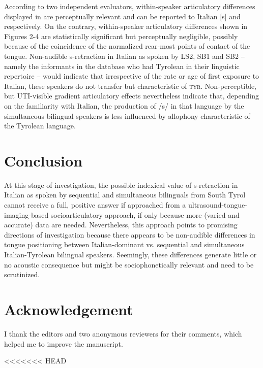 \documentclass[output=paper]{LSP/langsci}
\begin{document}
According to two independent evaluators, within-speaker articulatory differences displayed in  are perceptually relevant and can be reported to Italian [s] and %
respectively. On the contrary, within-speaker articulatory differences shown in Figures 2-4 are statistically significant but perceptually negligible, possibly because of the coincidence of the normalized rear-most points of contact of the tongue. Non-audible s-retraction in Italian as spoken by LS2, SB1 and SB2 – namely the informants in the database who had Tyrolean in their linguistic repertoire – would indicate that irrespective of the rate or age of first exposure to Italian, these speakers do not transfer but %
characteristic of \textsc{tyr}. Non-perceptible, but UTI-visible gradient articulatory effects nevertheless indicate that, depending on the familiarity with Italian, the production of /s/ in that language by the simultaneous bilingual speakers is less influenced by 
allophony characteristic of the Tyrolean language.

\section{Conclusion}
At this stage of investigation, the possible indexical value of s-retraction in Italian as spoken by sequential and simultaneous bilinguals from South Tyrol cannot receive a full, positive answer if approached from a ultrasound-tongue-imaging-based socioarticulatory approach, if only because more (varied and accurate) data are needed. Nevertheless, this approach points to promising directions of investigation because there appears to be non-audible differences in tongue positioning between Italian-dominant vs. sequential and simultaneous Italian-Tyrolean bilingual speakers. Seemingly, these differences generate little or no acoustic consequence but might be sociophonetically relevant and need to be scrutinized.

\section*{Acknowledgement}
I thank the editors and two anonymous reviewers for their comments, which helped me to improve the manuscript.

\printbibliography[heading=subbibliography,notkeyword=this]
<<<<<<< HEAD
\end{document}
